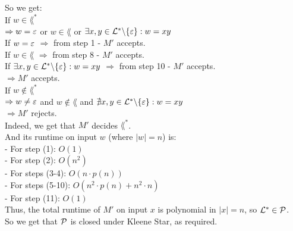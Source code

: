So we get: \\
If $w \in \lang^*$ \\
$\Rightarrow w = \varepsilon$ or $w \in \lang$ or $\exists x,y \in \mathcal{L}^* \backslash \{\varepsilon\}: w=xy$ \\
If $w = \varepsilon$  $\Rightarrow $ from step 1 - $M'$ accepts. \\
If $w \in \lang$  $\Rightarrow $ from step 8 - $M'$ accepts. \\
If $\exists x,y \in \mathcal{L}^* \backslash \{\varepsilon\}: w=xy$  $\Rightarrow $ from step 10 - $M'$ accepts. \\
$\Rightarrow M'$ accepts. \\

If $w \notin \lang^*$ \\
$\Rightarrow w \neq \varepsilon$ and $w \notin \lang$ and $\nexists x,y \in \mathcal{L}^* \backslash \{\varepsilon\}: w=xy$ \\
$\Rightarrow M'$ rejects. \\

Indeed, we get that $M'$ decides $\lang^*$. \\
And its runtime on input $w$ (where $|w|=n$) is: \\
- For step  (1):    $O(1)$                            \\
- For step  (2):    $O(n^2)$                          \\
- For steps (3-4):  $O(n \cdot p(n))$                 \\
- For steps (5-10): $O(n^2 \cdot p(n) + n^2 \cdot n)$ \\
- For step  (11):   $O(1)$                            \\

Thus, the total runtime of $M'$ on input $x$ is polynomial in $|x|=n$, so $\mathcal{L}^* \in \mathcal{P}$. \\
So we get that $\mathcal{P}$ is closed under Kleene Star, as required. \\

